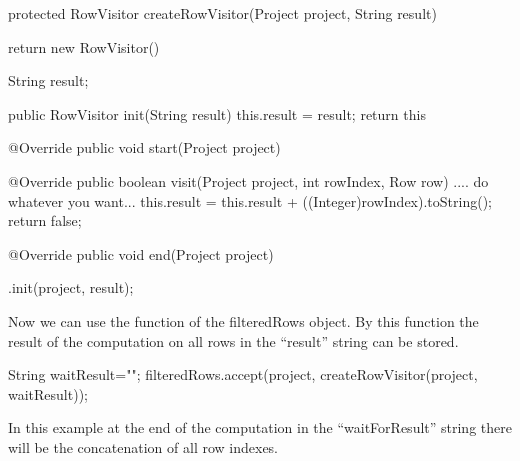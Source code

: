 \begin{code}
protected RowVisitor createRowVisitor(Project project,
                                      String result) {
   return new RowVisitor() {
      String result;
      
      public RowVisitor init(String result) {
         this.result = result;
         return this
      }
      
      @Override
      public void start(Project project){ }
      
      @Override
      public boolean visit(Project project, 
                          int rowIndex, 
                          Row row) {
        .... do whatever you want...
		this.result =
		    this.result + ((Integer)rowIndex).toString();
		return false;
	  }
	  
	  @Override
      public void end(Project project){ }
   }.init(project, result);
}
\end{code}
Now we can use the  function of the filteredRows object. By this function the result of the computation on all rows in the ``result'' string can be stored.
\begin{code}
String waitResult="";
filteredRows.accept(project, 
                   createRowVisitor(project, 
                                    waitResult));
\end{code}
In this example at the end of the computation in the ``waitForResult'' string there will be the concatenation of all row indexes.

